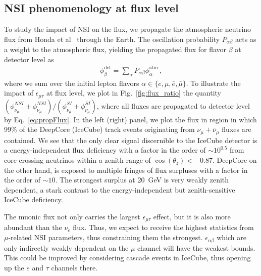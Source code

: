 \documentclass{revtex4-2}
\newcommand{\z}{\ensuremath{\cos{(\theta_z)}}}
\newcommand{\emt}{\ensuremath{\epsilon_{\mu\tau}}}
\renewcommand{\ne}{\nu_e}
\newcommand{\nm}{\nu_\mu}
\newcommand{\anm}{\bar\nu_\mu}
\begin{document}
\subsection{NSI phenomenology at flux level}\label{sec:nsiFluxEffects}
To study the impact of NSI on the flux, we propagate the atmospheric neutrino flux from Honda et al~\cite{hondapaper} through the Earth.
The oscillation probability $P_{\alpha \beta}$ acts as a weight to the atmospheric flux, yielding the propagated flux for flavor $\beta$ at detector level as 
\begin{align}\label{eq:propFlux}
    \phi_\beta^\text{det} = \sum_\alpha P_{\alpha\beta} \phi_\alpha^\text{atm} \,,
\end{align}
where we sum over the initial lepton flavors $\alpha \in \{e,\mu, \bar{e}, \bar{\mu}\}$.
To illustrate the impact of $\emt$ at flux level, 
we plot in Fig.~\ref{fig:flux_ratio} the quantity $(\phi_{\nu_\mu}^{NSI} + \phi_{\bar\nu_\mu}^{NSI})/(\phi_{\nu_\mu}^{SI} + \phi_{\bar\nu_\mu}^{SI})$, 
where all fluxes are propagated to detector level by Eq.~\ref{eq:propFlux}.
In the left (right) panel, we plot the flux in region in which 99\% of the 
DeepCore (IceCube) track events originating from $\nm + \anm$ fluxes are contained. We see that the only clear signal discernible to the IceCube detector
is a energy-independent flux deficiency with a factor in the order of $\sim 10^{0.5}$ from core-crossing neutrinos within a zenith range of $\z < -0.87$. DeepCore on the other hand, 
is exposed to multiple fringes of flux surpluses with a factor in the order of $\sim 10$. The strongest surplus at \SI{20}{\GeV} is very weakly zenith dependent, a stark contrast to the
energy-independent but zenith-sensitive IceCube deficiency.

The muonic flux not only carries the largest $\emt$ effect, but it is also more abundant than the $\ne$ flux. Thus, we expect to receive the highest statistics from $\mu$-related NSI parameters,
thus constraining them the strongest. $\epsilon_{\alpha\beta}$ which are only indirectly weakly dependent on the $\mu$ channel will have the weakest bounds. This could be improved
by considering cascade events in IceCube, thus opening up the $e$ and $\tau$ channels there.
\end{document}
